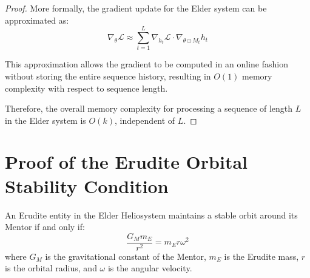 \begin{proof}
More formally, the gradient update for the Elder system can be approximated as:
\begin{equation}
\nabla_{\theta} \mathcal{L} \approx \sum_{t=1}^{L} \nabla_{h_t} \mathcal{L} \cdot \nabla_{\theta \odot M_t} h_t
\end{equation}

This approximation allows the gradient to be computed in an online fashion without storing the entire sequence history, resulting in $O(1)$ memory complexity with respect to sequence length.

Therefore, the overall memory complexity for processing a sequence of length $L$ in the Elder system is $O(k)$, independent of $L$.
\end{proof}

\section{Proof of the Erudite Orbital Stability Condition}

\begin{theorem}
An Erudite entity in the Elder Heliosystem maintains a stable orbit around its Mentor if and only if:
\begin{equation}
\frac{G_M m_E}{r^2} = m_E r \omega^2
\end{equation}
where $G_M$ is the gravitational constant of the Mentor, $m_E$ is the Erudite mass, $r$ is the orbital radius, and $\omega$ is the angular velocity.
\end{theorem}

